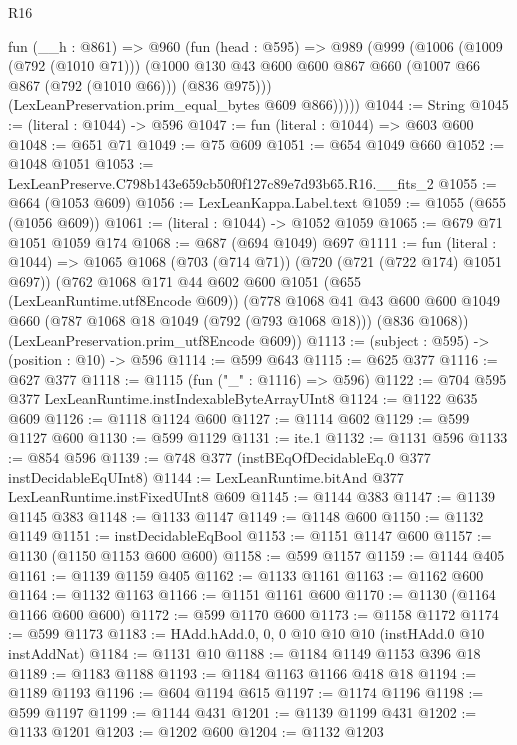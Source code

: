 \begin{lexlean}{R16}
\begin{coremodule}
      fun (__h : @861) =>
      @960
        (fun (head : @595) =>
        @989
          (@999
            (@1006
              (@1009 (@792 (@1010 @71)))
              (@1000 @130 @43 @600 @600 @867 @660 (@1007 @66 @867 (@792 (@1010 @66))) (@836 @975)))
            (LexLeanPreservation.prim_equal_bytes @609 @866)))))
@1044 := String
@1045 := (literal : @1044) -> @596
@1047 := fun (literal : @1044) => @603 @600
@1048 := @651 @71
@1049 := @75 @609
@1051 := @654 @1049 @660
@1052 := @1048 @1051
@1053 := LexLeanPreserve.C798b143e659cb50f0f127c89e7d93b65.R16.__fits_2
@1055 := @664 (@1053 @609)
@1056 := LexLeanKappa.Label.text
@1059 := @1055 (@655 (@1056 @609))
@1061 := (literal : @1044) -> @1052 @1059
@1065 := @679 @71 @1051 @1059 @174
@1068 := @687 (@694 @1049) @697
@1111 := fun (literal : @1044) =>
  @1065
    @1068
    (@703 (@714 @71))
    (@720 (@721 (@722 @174) @1051 @697))
    (@762
      @1068
      @171
      @44
      @602
      @600
      @1051
      (@655 (LexLeanRuntime.utf8Encode @609))
      (@778
        @1068
        @41
        @43
        @600
        @600
        @1049
        @660
        (@787 @1068 @18 @1049 (@792 (@793 @1068 @18)))
        (@836 @1068))
      (LexLeanPreservation.prim_utf8Encode @609))
@1113 := (subject : @595) -> (position : @10) -> @596
@1114 := @599 @643
@1115 := @625 @377
@1116 := @627 @377
@1118 := @1115 (fun ("_" : @1116) => @596)
@1122 := @704 @595 @377 LexLeanRuntime.instIndexableByteArrayUInt8
@1124 := @1122 @635 @609
@1126 := @1118 @1124 @600
@1127 := @1114 @602
@1129 := @599 @1127 @600
@1130 := @599 @1129
@1131 := ite.{1}
@1132 := @1131 @596
@1133 := @854 @596
@1139 := @748 @377 (instBEqOfDecidableEq.{0} @377 instDecidableEqUInt8)
@1144 := LexLeanRuntime.bitAnd @377 LexLeanRuntime.instFixedUInt8 @609
@1145 := @1144 @383
@1147 := @1139 @1145 @383
@1148 := @1133 @1147
@1149 := @1148 @600
@1150 := @1132 @1149
@1151 := instDecidableEqBool
@1153 := @1151 @1147 @600
@1157 := @1130 (@1150 @1153 @600 @600)
@1158 := @599 @1157
@1159 := @1144 @405
@1161 := @1139 @1159 @405
@1162 := @1133 @1161
@1163 := @1162 @600
@1164 := @1132 @1163
@1166 := @1151 @1161 @600
@1170 := @1130 (@1164 @1166 @600 @600)
@1172 := @599 @1170 @600
@1173 := @1158 @1172
@1174 := @599 @1173
@1183 := HAdd.hAdd.{0, 0, 0} @10 @10 @10 (instHAdd.{0} @10 instAddNat)
@1184 := @1131 @10
@1188 := @1184 @1149 @1153 @396 @18
@1189 := @1183 @1188
@1193 := @1184 @1163 @1166 @418 @18
@1194 := @1189 @1193
@1196 := @604 @1194 @615
@1197 := @1174 @1196
@1198 := @599 @1197
@1199 := @1144 @431
@1201 := @1139 @1199 @431
@1202 := @1133 @1201
@1203 := @1202 @600
@1204 := @1132 @1203

\end{coremodule}
\end{lexlean}
